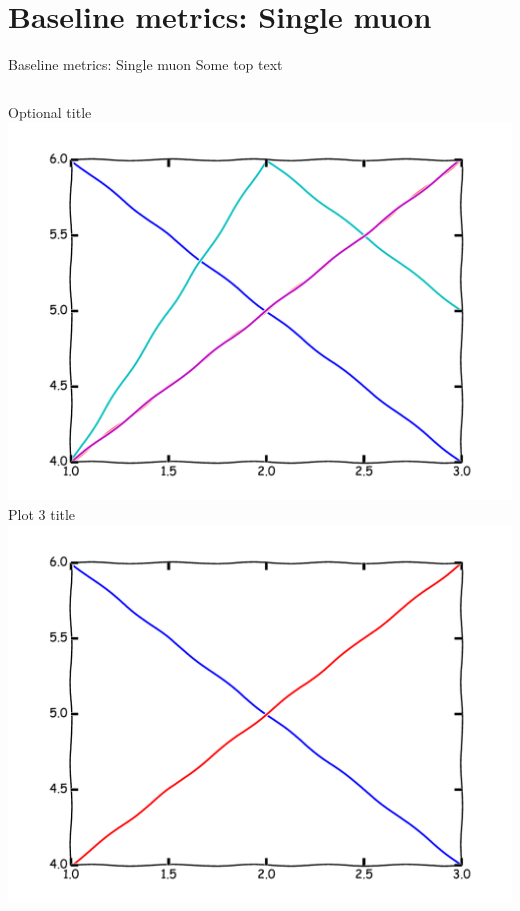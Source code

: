 
\section{Baseline metrics: Single muon}
\begin{frame}{Baseline metrics: Single muon}
Some top text
\begin{columns}
\begin{column}{0.4\textwidth}
\begin{center}
Optional title
\\
\includegraphics[width=\textwidth]{example/plot1.pdf}
\\
Plot 3 title
\\
\includegraphics[width=\textwidth]{example/plot3.pdf}
\\
\end{center}
\end{column}


\end{columns}
\end{frame}
